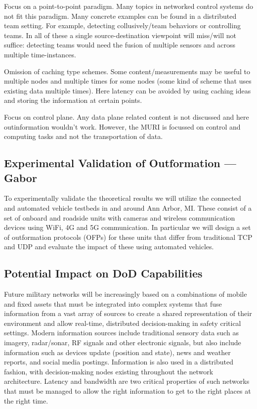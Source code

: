 \documentclass[12pt,letterpaper]{article}
\begin{document}
Focus on a point-to-point paradigm. Many topics in networked control systems do not fit this paradigm. Many concrete examples can be found in a distributed team setting. For example, detecting collusively/team behaviors or controlling teams. In all of these a single source-destination viewpoint will miss/will not suffice: detecting teams would need the fusion of multiple sensors and across multiple time-instances.

Omission of caching type schemes. Some content/measurements may be useful to multiple nodes and multiple times for some nodes (some kind of scheme that uses existing data multiple times). Here latency can be avoided by using caching ideas and storing the information at certain points.

Focus on control plane. Any data plane related content is not discussed and here outinformation wouldn't work. However, the MURI is focussed on control and computing tasks and not the transportation of data.


\subsection{Experimental Validation of Outformation --- Gabor}

To experimentally validate the theoretical results we will utilize the connected and automated vehicle testbeds in and around Ann Arbor, MI. These consist of a set of onboard and roadside units with cameras and wireless communication devices using WiFi, 4G and 5G communication. In particular we will design a set of outformation protocols (OFPs) for these units that differ from traditional TCP and UDP and evaluate the impact of these using automated vehicles.


\subsection{Potential Impact on DoD Capabilities}

Future military networks will be increasingly based on a combinations of mobile and fixed assets that must be integrated into complex systems that fuse information from a vast array of sources to create a shared representation of their environment and allow real-time, distributed decision-making in safety critical settings. Modern information sources include traditional sensory data such as imagery, radar/sonar, RF signals and other electronic signals, but also include information such as devices update (position and state), news and weather reports, and social media postings. Information is also used in a distributed fashion, with decision-making nodes existing throughout the network architecture. Latency and bandwidth are two critical properties of such networks that must be managed to allow the right information to get to the right places at the right time.
\end{document}
